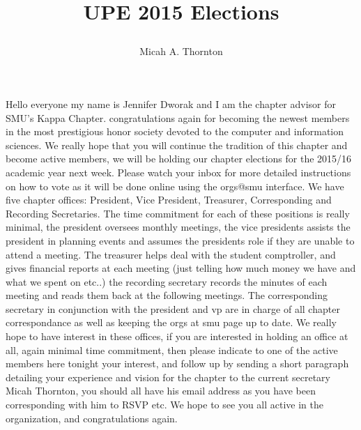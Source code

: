 \documentclass{article}
\title{UPE 2015 Elections\author{Micah A. Thornton}}
\begin{document}
\maketitle{}
Hello everyone my name is Jennifer Dworak and I am the chapter advisor for SMU's Kappa Chapter. congratulations again for becoming the newest members in the most prestigious honor society devoted to the computer and information sciences. We really hope that you will continue the tradition of this chapter and become active members, we will be holding our chapter elections for the 2015/16 academic year next week. Please watch your inbox for more detailed instructions on how to vote as it will be done online using the orgs@smu interface. We have five chapter offices: President, Vice President, Treasurer, Corresponding and Recording Secretaries. The time commitment for each of these positions is really minimal, the president oversees monthly meetings, the vice presidents assists the president in planning events and assumes the presidents role if they are unable to attend a meeting. The treasurer helps deal with the student comptroller, and gives financial reports at each meeting (just telling how much money we have and what we spent on etc..) the recording secretary records the minutes of each meeting and reads them back at the following meetings. The corresponding secretary in conjunction with the president and vp are in charge of all chapter correspondance as well as keeping the orgs at smu page up to date. We really hope to have interest in these offices, if you are interested in holding an office at all, again minimal time commitment, then please indicate to one of the active members here tonight your interest, and follow up by sending a short paragraph detailing your experience and vision for the chapter to the current secretary Micah Thornton, you should all have his email address as you have been corresponding with him to RSVP etc. We hope to see you all active in the organization, and congratulations again. 
\end{document}
